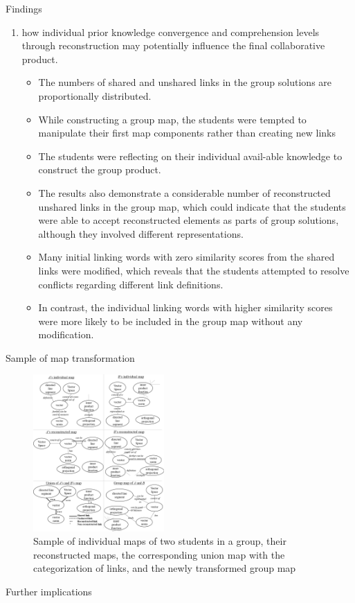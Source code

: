 \begin{frame}[allowframebreaks]{Findings}
\begin{enumerate}
    \item how individual prior knowledge convergence and comprehension 
          levels through reconstruction may potentially influence the final collaborative product.
          \begin{itemize}
            \item The numbers of shared and unshared links in the group solutions are proportionally distributed.
            \item While constructing a group map, the students were tempted to manipulate their first map components rather than creating new links
            \item The students were reflecting on their individual avail-able knowledge to construct the group product.
            \item The results also demonstrate a considerable number of reconstructed unshared links in the group map, which could indicate that the students were able to accept reconstructed elements as parts of group solutions, although they involved different representations. 
            \item Many initial linking words with zero similarity scores from the shared links were modified, which reveals that the students attempted to resolve conflicts regarding different link definitions.  
            \item In contrast, the individual linking words with higher similarity scores were more likely to be included in the group map without any modification.
          \end{itemize}
\end{enumerate}
    
\end{frame}

\begin{frame}{Sample of map transformation}
    \begin{figure}[tb]
        \begin{center}
            \includegraphics[width=50mm]{images/a3_sample_of_map.pdf}
        \end{center}
        \caption{Sample of individual maps of two students in a group, their reconstructed maps,
            the corresponding union map with the categorization of links, and the 
            newly transformed group map}
        \label{map_sample}
    \end{figure} 
\end{frame}

\begin{frame}{Further implications}
    
\end{frame}

